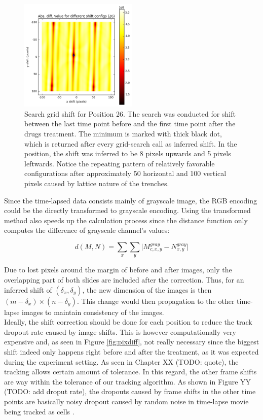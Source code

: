 \documentclass[pdftex,12pt,a4paper]{report}
\begin{document}
\begin{figure}[H]
\centering
\includegraphics[width=0.5\textwidth]{images/search_grid}
\caption{Search grid shift for Position 26. The search was conducted for shift between the last time point before and the first time point after the drugs treatment. The minimum is marked with thick black dot, which is returned after every grid-search call as inferred shift. In the position, the shift was inferred to be 8 pixels upwards and 5 pixels leftwards. Notice the repeating pattern of relatively favorable configurations after approximately 50 horizontal and 100 vertical pixels caused by lattice nature of the trenches.}
\label{fig:searchgrid}
\end{figure}


Since the time-lapsed data consists mainly of grayscale image, the RGB encoding could be the directly transformed to grayscale encoding. Using the transformed method also speeds up the calculation process since the distance function only computes the difference of grayscale channel's values:

$$
d(M, N) =  \sum_{x} \sum_{y} \vert M_{c, x, y}^{gray} - N_{x, y}^{gray}\vert
$$

Due to lost pixels around the margin of before and after images, only the overlapping part of both slides are included after the correction. Thus, for an inferred shift of $(\delta_x, \delta_y)$, the new dimension of the images is then $(m - \delta_x) \times (n - \delta_y)$. This change would then propagation to the other time-lapse images to maintain consistency of the images.\\

Ideally, the shift correction should be done for each position to reduce the track dropout rate caused by image shifts. This is however computationally very expensive and, as seen in Figure \ref{fig:pixdiff}, not really necessary since the biggest shift indeed only happens right before and after the treatment, as it was expected during the experiment setting. As seen in Chapter XX (TODO: quote), the tracking allows certain amount of tolerance. In this regard, the other frame shifts are way within the tolerance of our tracking algorithm. As shown in Figure YY (TODO: add droput rate), the dropouts caused by frame shifts in the other time points are basically noisy dropout caused by random noise in time-lapse movie being tracked as cells \cite{jaqaman2008robust}.
\end{document}
